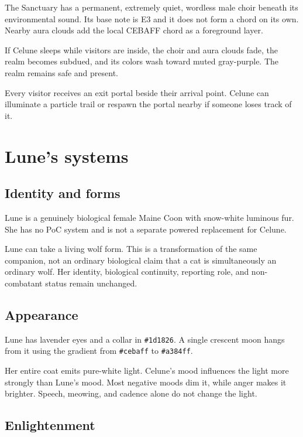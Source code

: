 \documentclass[10pt]{article}
\begin{document}
The Sanctuary has a permanent, extremely quiet, wordless male choir beneath its environmental sound. Its base note is E3 and it does not form a chord on its own. Nearby aura clouds add the local CEBAFF chord as a foreground layer.

If Celune sleeps while visitors are inside, the choir and aura clouds fade, the realm becomes subdued, and its colors wash toward muted gray-purple. The realm remains safe and present.

Every visitor receives an exit portal beside their arrival point. Celune can illuminate a particle trail or respawn the portal nearby if someone loses track of it.

\hypertarget{lunes-systems}{%
\section{Lune's systems}\label{lunes-systems}}

\hypertarget{identity-and-forms}{%
\subsection{Identity and forms}\label{identity-and-forms}}

Lune is a genuinely biological female Maine Coon with snow-white luminous fur. She has no PoC system and is not a separate powered replacement for Celune.

Lune can take a living wolf form. This is a transformation of the same companion, not an ordinary biological claim that a cat is simultaneously an ordinary wolf. Her identity, biological continuity, reporting role, and non-combatant status remain unchanged.

\hypertarget{appearance}{%
\subsection{Appearance}\label{appearance}}

Lune has lavender eyes and a collar in \texttt{\#1d1826}. A single crescent moon hangs from it using the gradient from \texttt{\#cebaff} to \texttt{\#a384ff}.

Her entire coat emits pure-white light. Celune's mood influences the light more strongly than Lune's mood. Most negative moods dim it, while anger makes it brighter. Speech, meowing, and cadence alone do not change the light.

\hypertarget{enlightenment}{%
\subsection{Enlightenment}\label{enlightenment}}
\end{document}
